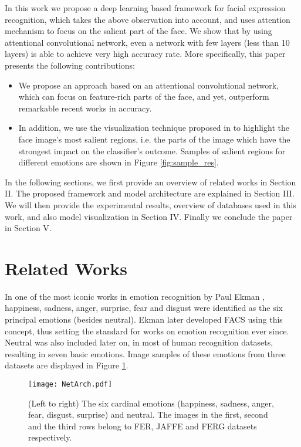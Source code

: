 \documentclass[conference]{IEEEtran}
\begin{document}
In this work we propose a deep learning based framework for facial expression recognition, which takes the above observation into account, and uses attention mechanism to focus on the salient part of the face. We show that by using attentional convolutional network, even a network with few layers (less than 10 layers) is able to achieve very high accuracy rate. 
More specifically, this paper presents the following contributions:
\begin{itemize}
\item We propose an approach based on an attentional convolutional network, which can  focus on feature-rich parts of the face, and yet, outperform remarkable recent works in accuracy.
\item In addition, we use the visualization technique proposed in \cite{fergus} to highlight the face image's most salient regions, i.e. the parts of the image which have the strongest impact on the classifier's outcome. Samples of salient regions for different emotions are shown in Figure \ref{fig:sample_res}.
\end{itemize}
In the following sections, we first provide an overview of related works in Section II.
The proposed framework and model architecture are explained in Section III. 
We will then provide the experimental results, overview of databases used in this work, and also model visualization in Section IV.
Finally we conclude the paper in Section V.



\section{Related Works}
In one of the most iconic works in emotion recognition by Paul Ekman \cite{ekman1971constants}, happiness, sadness, anger, surprise, fear and disgust were identified as the six principal emotions (besides neutral). 
Ekman later developed FACS \cite{FACS} using this concept, thus setting the standard for works on emotion recognition ever since. 
Neutral was also included later on, in most of human recognition datasets, resulting in seven basic emotions.
Image samples of these emotions from three datasets are displayed in Figure \ref{fig:FACSImage}.

\begin{figure}[h]
\begin{center}
   \texttt{[image: NetArch.pdf]}
\end{center}
   \caption{(Left to right) The six cardinal emotions (happiness, sadness, anger, fear, disgust, surprise) and neutral. The images in the first, second and the third rows belong to FER, JAFFE and FERG datasets respectively.}
\label{fig:FACSImage}
\end{figure}
\end{document}
